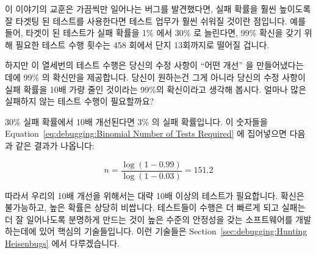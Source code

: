 이 이야기의 교훈은 가끔씩만 일어나는 버그를 발견했다면, 실패 확률을 훨씬
높이도록 잘 타겟팅 된 테스트를 사용한다면 테스트 업무가 훨씬 쉬워질 것이란
점입니다.
예를 들어, 타겟이 된 테스트가 실패 확률을 1\% 에서 30\% 로 늘린다면, 99\%
확신을 갖기 위해 필요한 테스트 수행 횟수는 458 회에서 단지 13회까지로 떨어질
겁니다.

하지만 이 열세번의 테스트 수행은 당신의 수정 사항이 ``어떤 개선'' 을
만들어냈다는 데에 99\% 의 확신만을 제공합니다.
당신이 원하는건 그게 아니라 당신의 수정 사항이 실패 확률을 10배 가량 줄인
것이라는 99\%의 확신이라고 생각해 봅시다.
얼마나 많은 실패하지 않는 테스트 수행이 필요할까요?

30\% 실패 확률에서 10배 개선된다면 3\% 의 실패 확률입니다.
이 숫자들을
Equation~\ref{eq:debugging:Binomial Number of Tests Required} 에 집어넣으면
다음과 같은 결과가 나옵니다:

\begin{equation}
	n = \frac{\log\left(1 - 0.99\right)}{\log\left(1 - 0.03\right)} = 151.2
\end{equation}

따라서 우리의 10배 개선을 위해서는 대략 10배 이상의 테스트가 필요합니다.
확신은 불가능하고, 높은 확률은 상당히 비쌉니다.
테스트들이 수행은 더 빠르게 되고 실패는 더 잘 일어나도록 분명하게 만드는 것이
높은 수준의 안정성을 갖는 소프트웨어를 개발하는데에 있어 핵심의 기술들입니다.
이런 기술들은
Section~\ref{sec:debugging:Hunting Heisenbugs} 에서 다루겠습니다.

